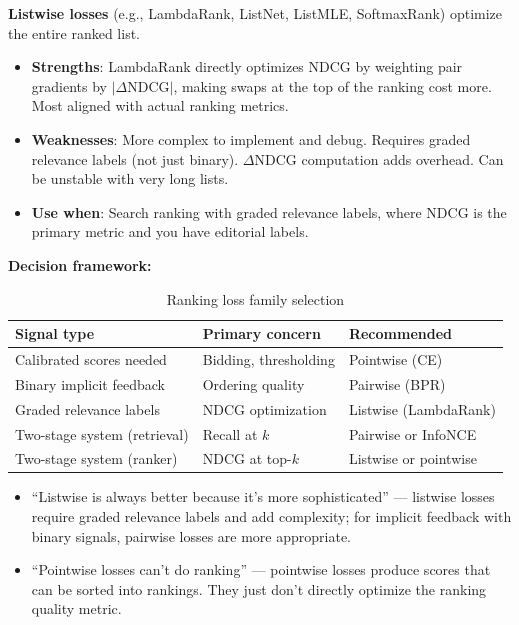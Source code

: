 \begin{interviewq}
\textbf{Listwise losses} (e.g., LambdaRank, ListNet, ListMLE, SoftmaxRank) optimize the entire ranked list.
\begin{itemize}
    \item \textbf{Strengths}: LambdaRank directly optimizes NDCG by weighting pair gradients by $|\Delta\text{NDCG}|$, making swaps at the top of the ranking cost more. Most aligned with actual ranking metrics.
    \item \textbf{Weaknesses}: More complex to implement and debug. Requires graded relevance labels (not just binary). $\Delta\text{NDCG}$ computation adds overhead. Can be unstable with very long lists.
    \item \textbf{Use when}: Search ranking with graded relevance labels, where NDCG is the primary metric and you have editorial labels.
\end{itemize}

\textbf{Decision framework:}
\begin{table}[H]
\centering
\caption{Ranking loss family selection}
\begin{tabularx}{\textwidth}{lXX}
\toprule
\textbf{Signal type} & \textbf{Primary concern} & \textbf{Recommended} \\
\midrule
Calibrated scores needed & Bidding, thresholding & Pointwise (CE) \\
Binary implicit feedback & Ordering quality & Pairwise (BPR) \\
Graded relevance labels & NDCG optimization & Listwise (LambdaRank) \\
Two-stage system (retrieval) & Recall at $k$ & Pairwise or InfoNCE \\
Two-stage system (ranker) & NDCG at top-$k$ & Listwise or pointwise \\
\bottomrule
\end{tabularx}
\end{table}

\redflags
\begin{itemize}
    \item ``Listwise is always better because it's more sophisticated'' --- listwise losses require graded relevance labels and add complexity; for implicit feedback with binary signals, pairwise losses are more appropriate.
    \item ``Pointwise losses can't do ranking'' --- pointwise losses produce scores that can be sorted into rankings. They just don't directly optimize the ranking quality metric.
\end{itemize}


\end{interviewq}
